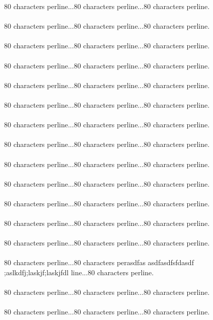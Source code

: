 {80 characters perline...80 characters perline...80 characters perline.\asdf\\\\
80 characters perline...80 characters perline...80 characters perline.\asdf\\\\
80 characters perline...80 characters perline...80 characters perline.\asdf\\\\
80 characters perline...80 characters perline...80 characters perline.\asdf\\\\
80 characters perline...80 characters perline...80 characters perline.\asdf\\\\
80 characters perline...80 characters perline...80 characters perline.\asdf\\\\
80 characters perline...80 characters perline...80 characters perline.\asdf\\\\
80 characters perline...80 characters perline...80 characters perline.\asdf\\\\
80 characters perline...80 characters perline...80 characters perline.\asdf\\\\
80 characters perline...80 characters perline...80 characters perline.\asdf\\\\
80 characters perline...80 characters perline...80 characters perline.\asdf\\\\
80 characters perline...80 characters perline...80 characters perline.\asdf\\\\
80 characters perline...80 characters perline...80 characters perline.\asdf\\\\
80 characters perline...80 characters perasdfas
asdfasdfsfdasdf ;aslkdfj;laskjf;laskjfdl
line...80 characters perline.\asdf\\\\
80 characters perline...80 characters perline...80 characters perline.\asdf\\\\
80 characters perline...80 characters perline...80 characters perline.\asdf\\\\
}
